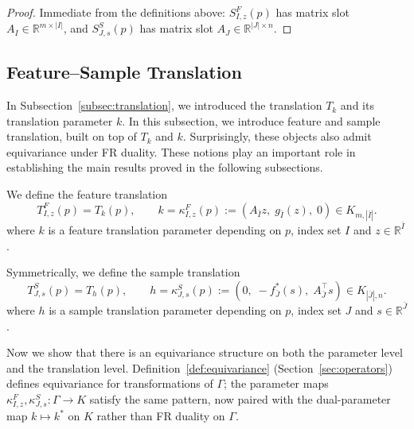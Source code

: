\begin{proof}
Immediate from the definitions above: \(S^F_{I,z}(p)\) has matrix slot
\(A_I\in\mathbb R^{m\times|I|}\), and \(S^S_{J,s}(p)\) has matrix slot
\(A_J\in\mathbb R^{|J|\times n}\).
\end{proof}







\subsection{Feature--Sample Translation}
In Subsection~\ref{subsec:translation}, we introduced the translation \(T_k\) and its translation parameter \(k\). In this subsection, we introduce feature and sample translation, built on top of \(T_k\) and \(k\).
Surprisingly, these objects also admit equivariance under FR duality.
These notions play an important role in establishing the main results proved in the following subsections.

\begin{definition}
    \label{def:feature-sample-translation}
    We define the feature translation
    \begin{equation*}
        T^F_{I, z}(p) = T_k(p), \qquad
        k = \kappa^F_{I, z}(p) :=  (A_{\bar I}z,\;g_{\bar I}(z),\;0)\in K_{m, |\bar I|}.
    \end{equation*}
    where \(k\) is a feature translation parameter depending on \(p\), index set \(I\) and \(z\in \mathbb R^{\bar I}\).

    Symmetrically, we define the sample translation
    \begin{equation*}
        T^S_{J, s}(p) = T_h(p), \qquad
        h = \kappa^S_{J, s}(p) := (0,\;-f_{\bar J}^{*}(s),\;A_{\bar J}^{\top}s)\in K_{|\bar J|, n}.
    \end{equation*}
    where \(h\) is a sample translation parameter depending on \(p\), index set \(J\) and \(s\in \mathbb R^{\bar J}\).
\end{definition}


Now we show that there is an equivariance structure on both the
parameter level and the translation level. Definition~\ref{def:equivariance}
(Section~\ref{sec:operators}) defines equivariance for transformations
of \(\Gamma\); the parameter maps \(\kappa^F_{I,z},\kappa^S_{J,s}:\Gamma\to K\)
satisfy the same pattern, now paired with the dual-parameter map
\(k\mapsto k^*\) on \(K\) rather than FR duality on \(\Gamma\).

